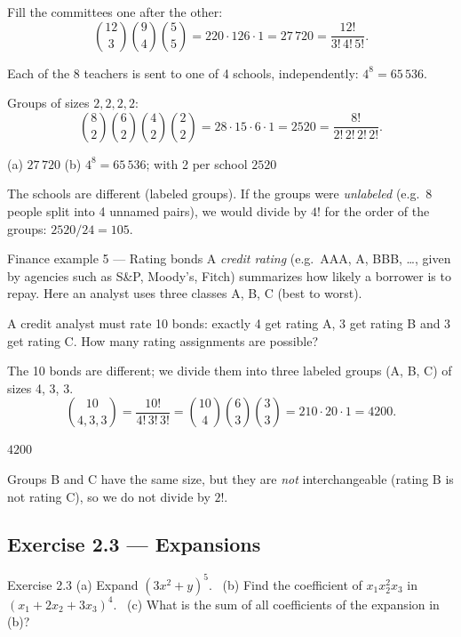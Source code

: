 	 Fill the committees one after the other:
	\[ \binom{12}{3}\binom94\binom55=220\cdot126\cdot1=27\,720
		=\frac{12!}{3!\,4!\,5!}. \]

	 Each of the 8 teachers is sent to one of 4
	schools, independently: $4^8=65\,536$.

	 Groups of sizes $2,2,2,2$:
	\[ \binom82\binom62\binom42\binom22=28\cdot15\cdot6\cdot1=2520
		=\frac{8!}{2!\,2!\,2!\,2!}. \]
	\begin{answer}
		(a) $27\,720$ \qquad (b) $4^8=65\,536$; with 2 per school $2520$
	\end{answer}
	\begin{remark}
		The schools are different (labeled groups). If the groups were
		\emph{unlabeled} (e.g.\ 8 people split into 4 unnamed pairs), we would
		divide by $4!$ for the order of the groups: $2520/24=105$.
	\end{remark}
\fi

\begin{fin}{Finance example 5 --- Rating bonds}
	\context A \emph{credit rating} (e.g.\ AAA, A, BBB, \ldots, given by
	agencies such as S\&P, Moody's, Fitch) summarizes how likely a borrower is
	to repay. Here an analyst uses three classes A, B, C (best to worst).

	A credit analyst must rate 10 bonds: exactly 4 get rating A, 3 get
	rating B and 3 get rating C. How many rating assignments are possible?
\end{fin}
\workspace{2cm}

\ifsolutions
	\soltitle
	\idea The 10 bonds are different; we divide them into three labeled groups
	(A, B, C) of sizes 4, 3, 3.
	\[ \binom{10}{4,3,3}=\frac{10!}{4!\,3!\,3!}=\binom{10}{4}\binom63\binom33
		=210\cdot20\cdot1=4200. \]
	\begin{answer}
		$4200$
	\end{answer}
	\begin{remark}
		Groups B and C have the same size, but they are \emph{not} interchangeable
		(rating B is not rating C), so we do not divide by $2!$.
	\end{remark}
\fi

\subsection{Exercise 2.3 --- Expansions}

\begin{task}{Exercise 2.3}
	(a) Expand $(3x^2+y)^5$. \
	(b) Find the coefficient of $x_1x_2^2x_3$ in $(x_1+2x_2+3x_3)^4$. \
	(c) What is the sum of all coefficients of the expansion in (b)?
\end{task}
\workspace{3.5cm}

